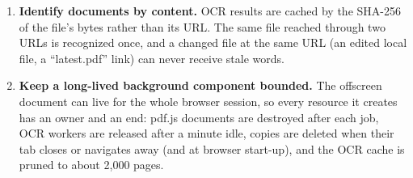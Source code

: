 \begin{enumerate}
        its PDF.js rendering exists purely for OCR (Section~\ref{sec:impl}).
  \item \textbf{Identify documents by content.} \label{dec:hash}
        OCR results are cached by the SHA-256 of the file's bytes rather than its
        URL. The same file reached through two URLs is recognized once, and a
        changed file at the same URL (an edited local file, a ``latest.pdf''
        link) can never receive stale words.
  \item \textbf{Keep a long-lived background component bounded.}
        \label{dec:bounded}
        The offscreen document can live for the whole browser session, so
        every resource it creates has an owner and an end: pdf.js documents are
        destroyed after each job, OCR workers are released after a minute idle,
        copies are deleted when their tab closes or navigates away (and at
        browser start-up), and the OCR cache is pruned to about 2{,}000 pages.
\end{enumerate}
